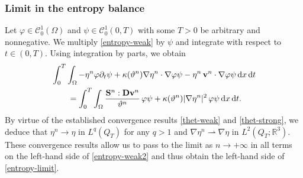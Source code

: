 \documentclass[11pt, a4paper, reqno]{amsart}
\newcommand{\R}{{\mathbb R}}
\numberwithin{equation}{section}
\newcommand{\dert}{\partial_t}
\newcommand{\thetah}{\hat\thet}
\newcommand{\vc}[1]{{\bf #1}}
\newcommand{\vv}{\vc{v}}
\newcommand{\thet}{\vartheta}
\renewcommand{\S}{\mathbf{S}}
\newcommand{\D}{\mathbf{D}}
\newcommand{\dt}{\,{\rm d} t }
\newcommand{\dx}{\,{\rm d} {x}}
\newcommand{\dxdt}{\dx  \dt}
\newcommand{\intTO}[1]{\int_0^T \int_{\Omega} #1  \dxdt}
\newcommand{\nm}[1]{\|#1\|}
\newcommand{\ab}[1]{{\color{blue}#1}}
\begin{document}



\subsubsection{Limit in the entropy balance}\label{sec:leb} Let $\varphi \in \mathcal{C}^1_0(\Omega)$ and $\psi\in \mathcal{C}_0^1(0,T)$ with some $T>0$ be arbitrary and nonnegative. We multiply \eqref{entropy-weak} by $\psi$ and integrate with respect to $t\in (0,T)$. Using integration by parts, we obtain 
\begin{equation}
\begin{split}\label{entropy-weak2}
&\intTO{ -\eta^n \varphi \dert\psi  + \kappa(\thet^n)\nabla\eta^n \cdot\nabla\varphi \psi - \eta^n\,\vv^n\cdot \nabla\varphi \psi} \\
&\qquad = \intTO{\frac{\S^n:\D{\vv}^n}{\thet^n}\,\varphi \psi +\kappa(\thet^n)|\nabla\eta^n|^2\,\varphi \psi}.
\end{split}
\end{equation}
By virtue of the established convergence results \eqref{thet-weak} and \eqref{thet-strong}, 
we deduce that $\eta^n \to \eta$ in $L^q(Q_T)$ for any $q>1$ and 
$\nabla\eta^n \rightharpoonup \nabla\eta$ in $L^2(Q_T;\R^3)$. 
These convergence results allow us to pass to the limit as $n\to+\infty$ in all terms on the left-hand side of \eqref{entropy-weak2} and thus obtain the left-hand side of \eqref{entropy-limit}. 
\end{document}
